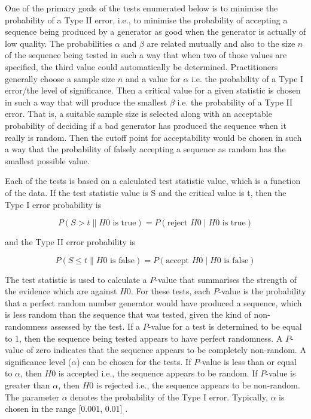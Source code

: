 One of the primary goals of the tests enumerated below is to minimise the probability of a Type II error, i.e., to minimise the probability of accepting a sequence being produced by a generator as good when the generator is actually of low quality. The probabilities $\alpha$ and $\beta$ are related mutually and also to the size $n$ of the sequence being tested in such a way that when two of those values are specified, the third value could automatically be determined. Practitioners generally choose a sample size $n$ and a value for $\alpha$ i.e. the probability of a Type I error/the level of significance. Then a critical value for a given statistic is chosen in such a way that will produce the smallest $\beta$ i.e. the probability of a Type II error. That is, a suitable sample size is selected along with an acceptable probability of deciding if a bad generator has produced the sequence when it really is random. Then the cutoff point for acceptability would be chosen in such a way that the probability of falsely accepting a sequence as random has the smallest possible value.

Each of the tests is based on a calculated test statistic value, which is a function of the data. If the test statistic value is S and the critical value is t, then the Type I error probability is 

\[
    P(S > t \parallel H0 \text{ is true}) = P(\text{reject } H0 \mid H0 \text{ is true})
\]

and the Type II error probability is

\[
    P(S \leq t \parallel H0 \text{ is false}) = P(\text{accept } H0 \mid H0 \text{ is false})
\]

The test statistic is used to calculate a $P$-value that summarises the strength of the evidence which are against $H0$. For these tests, each $P$-value is the probability that a perfect random number generator would have produced a sequence, which is less random than the sequence that was tested, given the kind of non-randomness assessed by the test. If a $P$-value for a test is determined to be equal to 1, then the sequence being tested appears to have perfect randomness. A $P$-value of zero indicates that the sequence appears to be completely non-random. A significance level ($\alpha$) can be chosen for the tests. If $P$-value is less than or equal to $\alpha$, then $H0$ is accepted i.e., the sequence appears to be random. If $P$-value is greater than $\alpha$, then $H0$ is rejected i.e., the sequence appears to be non-random. The parameter $\alpha$ denotes the probability of the Type I error. Typically, $\alpha$ is chosen in the range [0.001, 0.01] \cite{rep_nist_sp_80022}.

